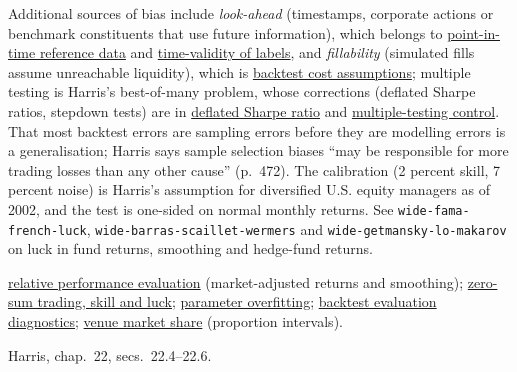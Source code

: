 \begin{qfmethod}
 Additional sources of bias include \emph{look-ahead} (timestamps, corporate actions or benchmark constituents that use future information), which belongs to \hyperref[data:trading-reference-data]{point-in-time reference data} and \hyperref[pit:label-weight-leakage]{time-validity of labels}, and \emph{fillability} (simulated fills assume unreachable liquidity), which is \hyperref[pit:backtest-cost-short-assumptions]{backtest cost assumptions}; multiple testing is Harris's best-of-many problem, whose corrections (deflated Sharpe ratios, stepdown tests) are in \hyperref[meth:deflated-sharpe-ratio]{deflated Sharpe ratio} and \hyperref[meth:multiple-testing-control]{multiple-testing control}. That most backtest errors are sampling errors before they are modelling errors is a generalisation; Harris says sample selection biases ``may be responsible for more trading losses than any other cause'' (p.~472). The calibration (2 percent skill, 7 percent noise) is Harris's assumption for diversified U.S. equity managers as of 2002, and the test is one-sided on normal monthly returns. See \nolinkurl{wide-fama-french-luck}, \nolinkurl{wide-barras-scaillet-wermers} and \nolinkurl{wide-getmansky-lo-makarov} on luck in fund returns, smoothing and hedge-fund returns.

 \hyperref[meth:relative-performance-evaluation]{relative performance evaluation} (market-adjusted returns and smoothing); \hyperref[res:zero-sum-skill-luck]{zero-sum trading, skill and luck}; \hyperref[pit:parameter-overfitting]{parameter overfitting}; \hyperref[meth:backtest-evaluation-diagnostics]{backtest evaluation diagnostics}; \hyperref[meth:venue-market-share]{venue market share} (proportion intervals).

 Harris, chap.~22, secs.~22.4--22.6.

\end{qfmethod}

